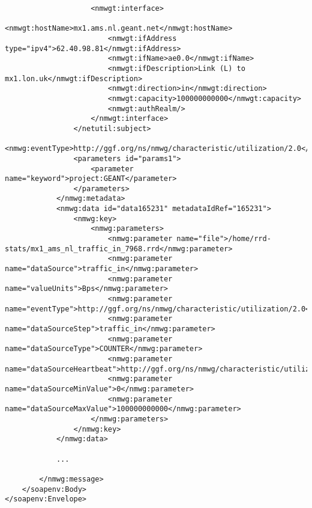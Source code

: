 \documentclass[a4paper,12pt,titlepage,hidelinks,fleqn]{article}
\begin{document}
\begin{flushleft}
\begin{framed}
\begin{lstlisting}
					<nmwgt:interface>
						<nmwgt:hostName>mx1.ams.nl.geant.net</nmwgt:hostName>
						<nmwgt:ifAddress type="ipv4">62.40.98.81</nmwgt:ifAddress>
						<nmwgt:ifName>ae0.0</nmwgt:ifName>
						<nmwgt:ifDescription>Link (L) to mx1.lon.uk</nmwgt:ifDescription>
						<nmwgt:direction>in</nmwgt:direction>
						<nmwgt:capacity>100000000000</nmwgt:capacity>
						<nmwgt:authRealm/>
					</nmwgt:interface>
				</netutil:subject>
				<nmwg:eventType>http://ggf.org/ns/nmwg/characteristic/utilization/2.0</nmwg:eventType>
				<parameters id="params1">
					<parameter name="keyword">project:GEANT</parameter>
				</parameters>
			</nmwg:metadata>
			<nmwg:data id="data165231" metadataIdRef="165231">
				<nmwg:key>
					<nmwg:parameters>
						<nmwg:parameter name="file">/home/rrd-stats/mx1_ams_nl_traffic_in_7968.rrd</nmwg:parameter>
						<nmwg:parameter name="dataSource">traffic_in</nmwg:parameter>
						<nmwg:parameter name="valueUnits">Bps</nmwg:parameter>
						<nmwg:parameter name="eventType">http://ggf.org/ns/nmwg/characteristic/utilization/2.0</nmwg:parameter>
						<nmwg:parameter name="dataSourceStep">traffic_in</nmwg:parameter>
						<nmwg:parameter name="dataSourceType">COUNTER</nmwg:parameter>
						<nmwg:parameter name="dataSourceHeartbeat">http://ggf.org/ns/nmwg/characteristic/utilization/2.0</nmwg:parameter>
						<nmwg:parameter name="dataSourceMinValue">0</nmwg:parameter>
						<nmwg:parameter name="dataSourceMaxValue">100000000000</nmwg:parameter>
					</nmwg:parameters>
				</nmwg:key>
			</nmwg:data>
			
			...
			
		</nmwg:message>
	</soapenv:Body>
</soapenv:Envelope>
\end{lstlisting}
\end{framed}
\end{flushleft}
\end{document}
